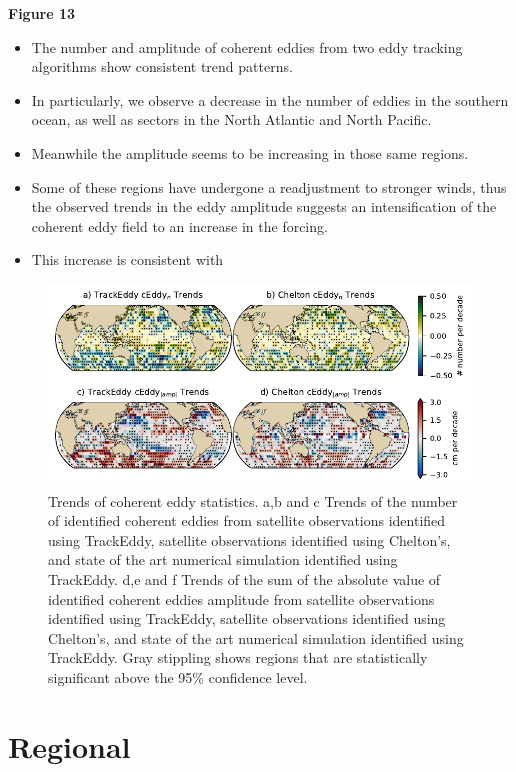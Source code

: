 \documentclass[draft,linenumbers]{agujournal2019}
\begin{document}
	\textbf{Figure 13}
	\begin{itemize}
		\item The number and amplitude of coherent eddies from two eddy tracking algorithms show consistent trend patterns. 
		\item In particularly, we observe a decrease in the number of eddies in the southern ocean, as well as sectors in the North Atlantic and North Pacific. 
		\item Meanwhile the amplitude seems to be increasing in those same regions. 
		\item Some of these regions have undergone a readjustment to stronger winds, thus the observed trends in the eddy amplitude suggests an intensification of the coherent eddy field to an increase in the forcing.
		\item This increase is consistent with \citet{Martinez_Kinetic_2021}
	\end{itemize}

	\begin{figure}
	    \centering
	    \includegraphics[width=1\textwidth]{figures/all_trackeddy_trends.pdf}
	    \caption{Trends of coherent eddy statistics. a,b and c Trends of the number of identified coherent eddies from satellite observations identified using TrackEddy, satellite observations identified using Chelton's, and state of the art numerical simulation identified using TrackEddy. d,e and f Trends of the sum of the absolute value of identified coherent eddies amplitude from satellite observations identified using TrackEddy, satellite observations identified using Chelton's, and state of the art numerical simulation identified using TrackEddy. Gray stippling shows regions that are statistically significant above the 95\% confidence level.
		}
	    \label{fig:eddy_stats_trends}
	\end{figure}


	\section{Regional}
\end{document}
